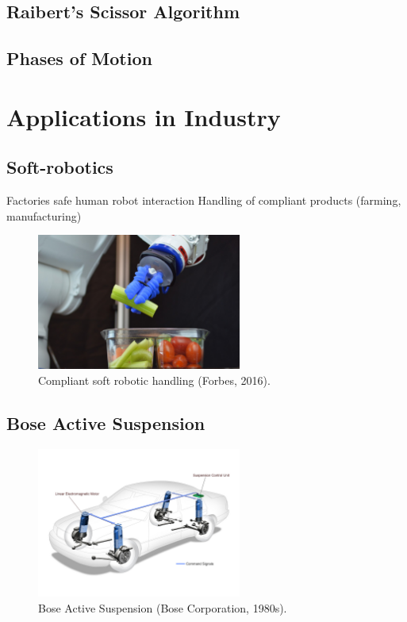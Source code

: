 \subsection{Raibert's Scissor Algorithm}

\subsection{Phases of Motion}

\section{Applications in Industry}
\subsection{Soft-robotics}
Factories safe human robot interaction
Handling of compliant products (farming, manufacturing)


\begin{figure}
\centering
\includegraphics[width=0.6\textwidth]{images/literature/SoftRobotCelery} 
\caption{Compliant soft robotic handling (Forbes, 2016).}
\label{fig:Compliant soft robotic handling}
\end{figure}
\cite{Knapp}

\subsection{Bose Active Suspension}

\begin{figure}
\centering
\includegraphics[width=0.6\textwidth]{images/literature/Bose-suspension-system.jpg} 
\caption{Bose Active Suspension (Bose Corporation, 1980s)\cite{Bose}.}
\label{fig:Bose Active Suspension}
\end{figure}

